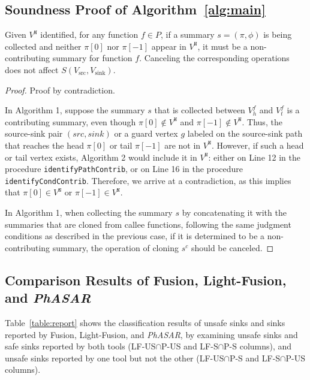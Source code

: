\subsection{Soundness Proof of Algorithm~\ref{alg:main}}
\label{app:sound}
\begin{theorem}[Soundness]
\label{thm:sound}

Given $V^{\texttt{N}}$ identified, for any function $f \in P$, if a summary $s=(\pi, \phi)$ is being collected and neither $\pi[0]$ nor $\pi[-1]$ appear in $V^{\texttt{N}}$, it must be a non-contributing summary for function $f$. Canceling the corresponding operations does not affect $S(V_{\text{src}}, V_{\text{sink}})$.
\begin{proof}

Proof by contradiction.

In Algorithm 1, suppose the summary $s$ that is collected between $V_{h}^{f}$ and $V_{t}^{f}$ is a contributing summary, even though $\pi[0] \notin V^{\texttt{N}}$ and $\pi[-1] \notin V^{\texttt{N}}$. 
Thus, the source-sink pair $(src, sink)$ or a guard vertex $g$ labeled on the source-sink path that reaches the head $\pi[0]$ or tail $\pi[-1]$ are not in $V^{\texttt{N}}$. 
However, if such a head or tail vertex exists, Algorithm 2 would include it in $V^{\texttt{N}}$: either on Line 12 in the procedure \texttt{identifyPathContrib}, or on Line 16 in the procedure \texttt{identifyCondContrib}.
Therefore, we arrive at a contradiction, as this implies that $\pi[0] \in V^{\texttt{N}}$ or $\pi[-1] \in V^{\texttt{N}}$. 

In Algorithm 1, when collecting the summary $s$ by concatenating it with the summaries that are cloned from callee functions, following the same judgment conditions as described in the previous case, if it is determined to be a non-contributing summary, the operation of cloning $s^{c}$ should be canceled.
\end{proof}
\end{theorem}


\subsection{Comparison Results of Fusion, Light-Fusion, and \textit{PhASAR}}
\label{app:comparison}

Table~\ref{table:report} shows the classification results of unsafe sinks and sinks reported by Fusion, Light-Fusion, and \textit{PhASAR},
by examining unsafe sinks and safe sinks reported by both tools (LF-US$\cap$P-US and LF-S$\cap$P-S columns), and unsafe sinks reported by one tool but not the other (LF-US$\cap$P-S and LF-S$\cap$P-US columns).

